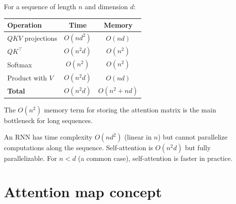 \begin{theorem}
For a sequence of length $n$ and dimension $d$:
\begin{center}
\begin{tabular}{lcc}
\toprule
\textbf{Operation} & \textbf{Time} & \textbf{Memory} \\
\midrule
$QKV$ projections & $O(n d^2)$ & $O(n d)$ \\
$Q K^\top$ & $O(n^2 d)$ & $O(n^2)$ \\
Softmax & $O(n^2)$ & $O(n^2)$ \\
Product with $V$ & $O(n^2 d)$ & $O(n d)$ \\
\midrule
\textbf{Total} & $O(n^2 d)$ & $O(n^2 + n d)$ \\
\bottomrule
\end{tabular}
\end{center}
The $O(n^2)$ memory term for storing the attention matrix is the main
bottleneck for long sequences.
\end{theorem}

\begin{remark}
An RNN has time complexity $O(n d^2)$ (linear in $n$) but cannot
parallelize computations along the sequence. Self-attention is $O(n^2 d)$
but fully parallelizable. For $n < d$ (a common case), self-attention is
faster in practice.
\end{remark}

\section{Attention map concept}
\label{sec:attention-heatmap}

